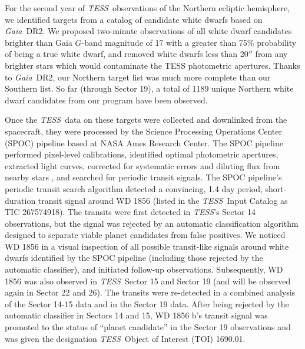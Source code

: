 \documentclass{nature3}
\newcommand{\project}[1]{\textsl{#1}}
\newcommand{\Gaia}{\project{Gaia}}
\newcommand{\TESS}{\project{TESS}}
\begin{document}
\begin{methods}
For the second year of \TESS\ observations of the Northern ecliptic hemisphere, we identified targets from a catalog of candidate white dwarfs\cite{GentileFusillo} based on \Gaia\ DR2. We proposed two-minute observations of all white dwarf candidates brighter than Gaia $G$-band magnitude of 17 with a greater than 75\% probability of being a true white dwarf, and removed white dwarfs less than 20$''$ from any brighter stars which would contaminate the TESS photometric apertures. Thanks to \Gaia\ DR2, our Northern target list was much more complete than our Southern list. So far (through Sector 19), a total of 1189 unique Northern white dwarf candidates from our program have been observed.  

Once the \TESS\ data on these targets were collected and downlinked from the spacecraft, they were processed by the Science Processing Operations Center (SPOC) pipeline\cite{Jenkins:2015, Jenkins:2016} based at NASA Ames Research Center. The SPOC pipeline performed pixel-level calibrations, identified optimal photometric apertures, extracted light curves, corrected for systematic errors and diluting flux from nearby stars \cite{smith, stumpe}, and searched for periodic transit signals\cite{jenkins:2002}. The SPOC pipeline's periodic transit search algorithm detected a convincing, 1.4 day period, short-duration transit signal around WD 1856 (listed in the \TESS\ Input Catalog as TIC 267574918). The transits were first detected in \TESS's Sector 14 observations, but the signal was rejected by an automatic classification algorithm designed to separate viable planet candidates from false positives\cite{guerrero}. We noticed WD 1856 in a visual inspection of all possible transit-like signals around white dwarfs identified by the SPOC pipeline (including those rejected by the automatic classifier), and initiated follow-up observations. Subsequently, WD 1856 was also observed in \TESS\ Sector 15 and Sector 19 (and will be observed again in Sector 22 and 26). The transits were re-detected in a combined analysis of the Sector 14-15 data and in the Sector 19 data. After being rejected by the automatic classifier in Sectors 14 and 15, WD 1856 b's transit signal was promoted to the status of ``planet candidate'' in the Sector 19 observations and was given the designation \TESS\ Object of Interest (TOI) 1690.01. 


\end{methods}
\end{document}
